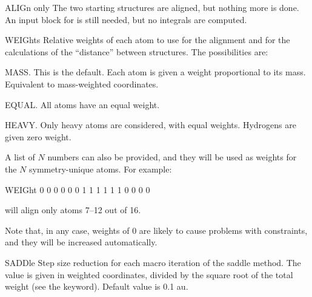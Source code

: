 \begin{keywordlist}
\item[ALIGn only]
The two starting structures are aligned, but nothing more is done.
An input block for  is still needed, but no integrals are computed.

\item[WEIGhts]
Relative weights of each atom to use for the alignment and for the calculations of the
``distance'' between structures. The possibilities are:

MASS. This is the default. Each atom is given a weight proportional to its mass. Equivalent
to mass-weighted coordinates.

EQUAL. All atoms have an equal weight.

HEAVY. Only heavy atoms are considered, with equal weights. Hydrogens are given zero weight.

A list of $N$ numbers can also be provided, and they will be used as weights for the $N$
symmetry-unique atoms. For example:

\begin{sourcelisting}
WEIGht
0 0 0 0 0 0 1 1 1 1 1 1 0 0 0 0
\end{sourcelisting}

will align only atoms 7--12 out of 16.

Note that, in any case, weights of 0 are likely to cause problems with constraints, and they will
be increased automatically.

\item[SADDle]
Step size reduction for each macro iteration of the saddle method.
The value is given in weighted coordinates, divided by the square root of the total weight
(see the  keyword).
Default value is 0.1 au.

\end{keywordlist}

